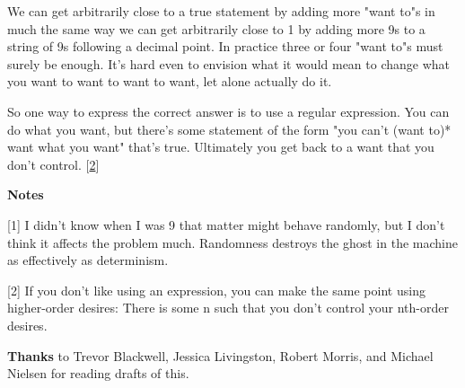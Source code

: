 We can get
                  arbitrarily close to a true statement by adding more "want
                  to"s in much the same way we can get arbitrarily close to 1 by
                  adding more 9s to a string of 9s following a decimal point. In
                  practice three or four "want to"s must surely be enough. It's
                  hard even to envision what it would mean to change what you
                  want to want to want to want, let alone actually do it.

So
                  one way to express the correct answer is to use a regular
                  expression. You can do what you want, but there's some
                  statement of the form "you can't (want to)* want what you
                  want" that's true. Ultimately you get back to a want that you
                  don't control.
                  [\href{\#f2n}{2}]












                  \textbf{Notes}

[1] I didn't know when I was 9 that matter might behave
                  randomly, but I don't think it affects the problem much.
                  Randomness destroys the ghost in the machine as effectively as
                  determinism.

[2] If you don't like using an expression, you can make the
                  same point using higher-order desires: There is some n such
                  that you don't control your nth-order desires.




                  \textbf{Thanks} to Trevor Blackwell, Jessica Livingston,
                    Robert Morris, and Michael Nielsen for reading drafts of
                    this.


              
            
          
